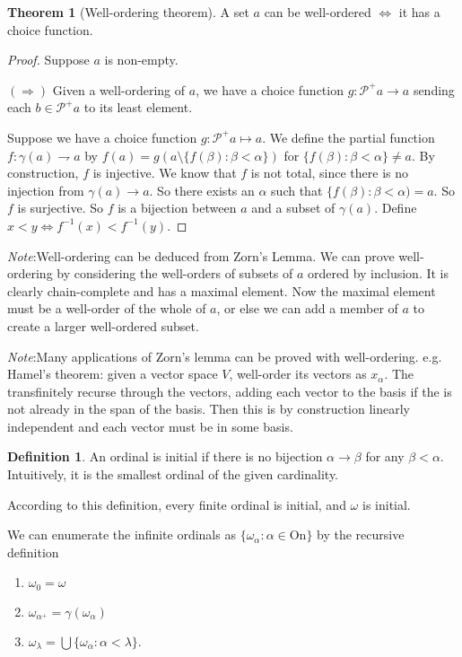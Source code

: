 \documentclass[a4paper]{article}
\theoremstyle{definition}
\newtheorem*{thm}{Theorem}
\newtheorem*{defi}{Definition}
\newcommand{\note}{\noindent \emph{Note}:\;}
\newcommand{\Po}{\mathcal{P}}
\newcommand{\On}{\mathrm{On}}
\begin{document}
\begin{thm}[Well-ordering theorem]
  A set $a$ can be well-ordered $\Leftrightarrow$ it has a choice function.
\end{thm}

\begin{proof}
  Suppose $a$ is non-empty.

  $(\Rightarrow)$ Given a well-ordering of $a$, we have a choice function $g: \Po^+a \to a$ sending each $b\in \Po^+a$ to its least element.

  Suppose we have a choice function $g: \Po^+a \mapsto a$. We define the partial function $f: \gamma(a) \rightharpoondown a$ by $f(a) = g(a\setminus \{f(\beta): \beta < \alpha\})$ for $\{f(\beta): \beta < \alpha\}\not= a$. By construction, $f$ is injective. We know that $f$ is not total, since there is no injection from $\gamma(a)\to a$. So there exists an $\alpha$ such that $\{f(\beta): \beta < \alpha) = a$. So $f$ is surjective. So $f$ is a bijection between $a$ and a subset of $\gamma(a)$. Define $x < y\Leftrightarrow f^{-1}(x) < f^{-1}(y)$.
\end{proof}

\note Well-ordering can be deduced from Zorn's Lemma. We can prove well-ordering by considering the well-orders of subsets of $a$ ordered by inclusion. It is clearly chain-complete and has a maximal element. Now the maximal element must be a well-order of the whole of $a$, or else we can add a member of $a$ to create a larger well-ordered subset.

\note Many applications of Zorn's lemma can be proved with well-ordering. e.g. Hamel's theorem: given a vector space $V$, well-order its vectors as $x_\alpha$. The transfinitely recurse through the vectors, adding each vector to the basis if the is not already in the span of the basis. Then this is by construction linearly independent and each vector must be in some basis.

\begin{defi}
  An ordinal is initial if there is no bijection $\alpha\to \beta$ for any $\beta < \alpha$. Intuitively, it is the smallest ordinal of the given cardinality.
\end{defi}

According to this definition, every finite ordinal is initial, and $\omega$ is initial.

We can enumerate the infinite ordinals as $\{\omega_\alpha : \alpha\in \On\}$ by the recursive definition
\begin{enumerate}
\item $\omega_0 = \omega$
\item $\omega_{\alpha^+} = \gamma(\omega_\alpha)$
\item $\omega_\lambda = \bigcup\{\omega_\alpha: \alpha < \lambda\}$.
\end{enumerate}
\end{document}
